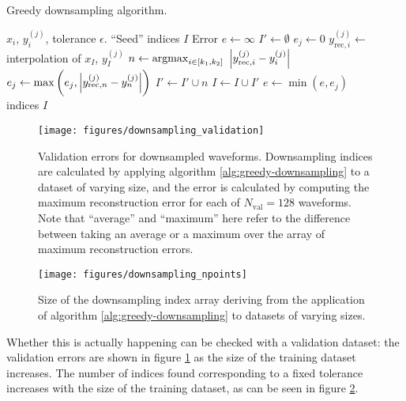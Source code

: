 \documentclass[main.tex]{subfiles}
\begin{document}
\begin{algorithm}
\caption{Greedy downsampling algorithm. }\label{alg:greedy-downsampling}
\begin{algorithmic}
\Require \(x_i\), \(y_i^{(j)}\), tolerance \(\epsilon \).
\Require ``Seed'' indices \(I\)
\State Error \(e \gets \infty \)
\State \(I' \gets \emptyset\)
\State \( e_j \gets 0\)
\State \(y_{\text{rec}, i}^{(j)} \gets\) interpolation of \(x_I\), \(y_I^{(j)}\)
\State \(n \gets \operatorname{argmax}_{i \in [k_1 , k_2 ]} \ \abs{y _{\text{rec}, i}^{(j)} - y_{i}^{(j)}}\)
\State \(e_j \gets \max \left( e_j, \abs{y _{\text{rec}, n}^{(j)} - y_{n}^{(j)}}\right)\)
\State \(I' \gets I' \cup n\)
\EndIf
\State \(I \gets I \cup I'\)
\EndFor
\State \(e \gets \min (e, e_j)\)
\EndFor
\EndWhile \\
\Return indices \(I\)
\end{algorithmic}
\end{algorithm}

\begin{figure}[ht]
\centering
\texttt{[image: figures/downsampling\_validation]}
\caption{Validation errors for downsampled waveforms. Downsampling indices are calculated by applying algorithm \ref{alg:greedy-downsampling} to a dataset of varying size, and the error is calculated by computing the maximum reconstruction error for each of \(N _{\text{val}} = 128\) waveforms. Note that ``average'' and ``maximum'' here refer to the difference between taking an average or a maximum over the array of maximum reconstruction errors. }
\label{fig:downsampling_validation}
\end{figure}

\begin{figure}[ht]
\centering
\texttt{[image: figures/downsampling\_npoints]}
\caption{Size of the downsampling index array deriving from the application of algorithm \ref{alg:greedy-downsampling} to datasets of varying sizes.}
\label{fig:downsampling_npoints}
\end{figure}

Whether this is actually happening can be checked with a validation dataset: the validation errors are shown in figure \ref{fig:downsampling_validation} as the size of the training dataset increases.
The number of indices found corresponding to a fixed tolerance increases with the size of the training dataset, as can be seen in figure \ref{fig:downsampling_npoints}. 
\end{document}
